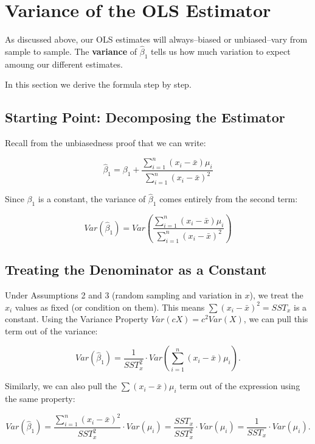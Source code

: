 \documentclass[
  letterpaper,
  DIV=11,
  numbers=noendperiod]{scrreprt}
\begin{document}
\section{Variance of the OLS
Estimator}\label{variance-of-the-ols-estimator}

As discussed above, our OLS estimates will always--biased or
unbiased--vary from sample to sample. The \textbf{variance} of
\(\hat{\beta}_1\) tells us how much variation to expect amoung our
different estimates.

In this section we derive the formula step by step.

\subsection{Starting Point: Decomposing the
Estimator}\label{starting-point-decomposing-the-estimator}

Recall from the unbiasedness proof that we can write:

\[
\hat{\beta}_1 = \beta_1 + \frac{\sum_{i=1}^{n}(x_i - \bar{x})\mu_i}{\sum_{i=1}^{n}(x_i - \bar{x})^2}
\]

Since \(\beta_1\) is a constant, the variance of \(\hat{\beta}_1\) comes
entirely from the second term:

\[
Var(\hat{\beta}_1) = Var\left(\frac{\sum_{i=1}^{n}(x_i - \bar{x})\mu_i}{\sum_{i=1}^{n}(x_i - \bar{x})^2}\right)
\]

\subsection{Treating the Denominator as a
Constant}\label{treating-the-denominator-as-a-constant}

Under Assumptions 2 and 3 (random sampling and variation in \(x\)), we
treat the \(x_i\) values as fixed (or condition on them). This means
\(\sum(x_i - \bar{x})^2 = SST_x\) is a constant. Using the Variance
Property \(Var(cX) = c^2 Var(X)\), we can pull this term out of the
variance:

\[
Var(\hat{\beta}_1) = \frac{1}{SST_x^2} \cdot Var\left(\sum_{i=1}^{n}(x_i - \bar{x})\mu_i\right).
\]

Similarly, we can also pull the \(\sum(x_i - \bar{x})\mu_i\) term out of
the expression using the same property:

\[
Var(\hat{\beta}_1) = \frac{\sum_{i=1}^{n}(x_i - \bar{x})^2}{SST_x^2} \cdot Var(\mu_i) = 
\frac{SST_x}{SST_x^2} \cdot Var(\mu_i) = \frac{1}{SST_x} \cdot Var(\mu_i).
\]
\end{document}
